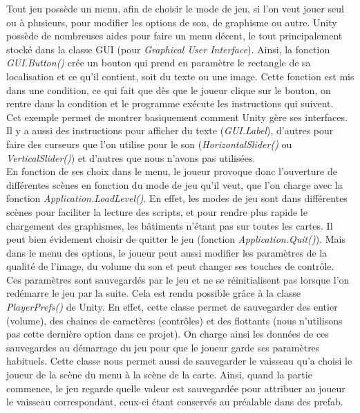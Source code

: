 \documentclass[12pt, titlepage]{article}
\begin{document}
\begin{spacing}{1.5}
Tout jeu possède un menu, afin de choisir le mode de jeu, si l'on veut jouer seul ou à plusieurs, pour modifier les options de son, de graphisme ou autre. Unity possède de nombreuses aides pour faire un menu décent, le tout principalement stocké dans la classe GUI (pour \textit{Graphical User Interface}). Ainsi, la fonction \textit{GUI.Button()} crée un bouton qui prend en paramètre le rectangle de sa localisation et ce qu'il contient, soit du texte ou une image. Cette fonction est mis dans une condition, ce qui fait que dès que le joueur clique sur le bouton, on rentre dans la condition et le programme exécute les instructions qui suivent.\\

Cet exemple permet de montrer basiquement comment Unity gère ses interfaces. Il y a aussi des instructions pour afficher du texte (\textit{GUI.Label}), d'autres pour faire des curseurs que l'on utilise pour le son (\textit{HorizontalSlider()} ou \textit{VerticalSlider()}) et d'autres que nous n'avons pas utilisées.\\

En fonction de ses choix dans le menu, le joueur provoque donc l'ouverture de différentes scènes en fonction du mode de jeu qu'il veut, que l'on charge avec la fonction \textit{Application.LoadLevel()}. En effet, les modes de jeu sont dans différentes scènes pour faciliter la lecture des scripts, et pour rendre plus rapide le chargement des graphismes, les bâtiments n'étant pas sur toutes les cartes. Il peut bien évidement choisir de quitter le jeu (fonction \textit{Application.Quit()}). Mais dans le menu des options, le joueur peut aussi modifier les paramètres de la qualité de l'image, du volume du son et peut changer ses touches de contrôle.\\

Ces paramètres sont sauvegardés par le jeu et ne se réinitialisent pas lorsque l'on redémarre le jeu par la suite. Cela est rendu possible grâce à la classe \textit{PlayerPrefs()} de Unity. En effet, cette classe permet de sauvegarder des entier (volume), des chaines de caractères (contrôles) et des flottants (nous n'utilisons pas cette dernière option dans ce projet). On charge ainsi les données de ces sauvegardes au démarrage du jeu pour que le joueur garde ses paramètres habituels. Cette classe nous permet aussi de sauvegarder le vaisseau qu'a choisi le joueur de la scène du menu à la scène de la carte. Ainsi, quand la partie commence, le jeu regarde quelle valeur est sauvegardée pour attribuer au joueur le vaisseau correspondant, ceux-ci étant conservés au préalable dans des prefab.\\


\end{spacing}
\end{document}
